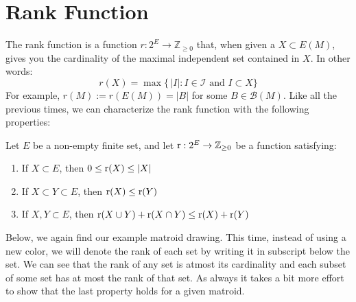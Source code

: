 

\section{Rank Function}

The rank function is a function $r:2^E \rightarrow \mathbb{Z}_{\geq0}$ that, when given a $X\subset E(M)$, gives you the cardinality of the maximal independent set contained in $X$. In other words:
$$ r(X) = \max\{\, |I| : I\in\mathcal{I} \text{ and } I\subset X \} $$
For example, $r(M):=r(E(M))=|B|$ for some $B\in\mathcal{B}(M)$. Like all the previous times, we can characterize the rank function with the following properties:

\begin{defn}
    Let $E$ be a non-empty finite set, and let $\text{r} : 2^E \rightarrow \mathbb{Z}_{\geq0}$ be a function satisfying:
    \begin{enumerate}
        \item If $X\subset E$, then $0 \leq \text{r}(X) \leq |X| $
        \item If $X\subset Y\subset E$, then $\text{r}(X)\leq\text{r}(Y)$
        \item If $X,Y\subset E$, then $\text{r}(X\cup Y)+\text{r}(X\cap Y) \leq \text{r}(X)+\text{r}(Y) $
    \end{enumerate}
\end{defn}

Below, we again find our example matroid drawing. This time, instead of using a new color, we will denote the rank of each set by writing it in subscript below the set. We can see that the rank of any set is atmost its cardinality and each subset of some set has at most the rank of that set. As always it takes a bit more effort to show that the last property holds for a given matroid.

